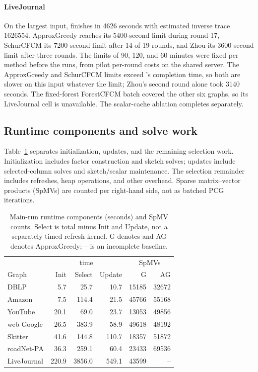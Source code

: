 \paragraph{LiveJournal}
On the largest input, \alg{} finishes in 4626 seconds with estimated
inverse trace 1626554. ApproxGreedy reaches its 5400-second limit
during round 17, SchurCFCM its 7200-second limit after 14 of 19
rounds, and Zhou its 3600-second limit after three rounds.
The limits of 90, 120, and 60 minutes were fixed per method before
the runs, from pilot per-round costs on the shared server. The
ApproxGreedy and SchurCFCM limits exceed \alg{}'s completion time, so
both are slower on this input whatever the limit; Zhou's second round
alone took 3140 seconds. The fixed-forest
ForestCFCM batch covered the other six graphs, so its LiveJournal
cell is unavailable. The scalar-cache ablation completes separately.

\subsection{Runtime components and solve work}\label{sec:workprofile}
Table~\ref{tab:workprofile} separates initialization, updates, and the
remaining selection work. Initialization includes factor construction
and sketch solves; updates include selected-column solves and
sketch/scalar maintenance. The selection remainder includes refreshes,
heap operations, and other overhead. Sparse matrix--vector products
(SpMVs) are counted per right-hand side, not as batched PCG iterations.

\begin{table}[t]
\centering\footnotesize
\caption{Main-run runtime components (seconds) and SpMV counts.
Select is total minus Init and Update, not a separately timed refresh
kernel. G denotes \alg{} and AG denotes ApproxGreedy; -- is an
incomplete baseline.}\label{tab:workprofile}
\setlength{\tabcolsep}{2.5pt}
\begin{tabular}{@{}lrrrrr@{}}\toprule
& \multicolumn{3}{c}{\alg{} time} & \multicolumn{2}{c}{SpMVs}\\
Graph & Init & Select & Update & G & AG\\\midrule
DBLP & 5.7 & 25.7 & 10.7 & 15185 & 32672\\
Amazon & 7.5 & 114.4 & 21.5 & 45766 & 55168\\
YouTube & 20.1 & 69.0 & 23.7 & 13053 & 49856\\
web-Google & 26.5 & 383.9 & 58.9 & 49618 & 48192\\
Skitter & 41.6 & 144.8 & 110.7 & 18357 & 51872\\
roadNet-PA & 36.3 & 259.1 & 60.4 & 23433 & 69536\\
LiveJournal & 220.9 & 3856.0 & 549.1 & 43599 & --\\
\bottomrule\end{tabular}
\end{table}

